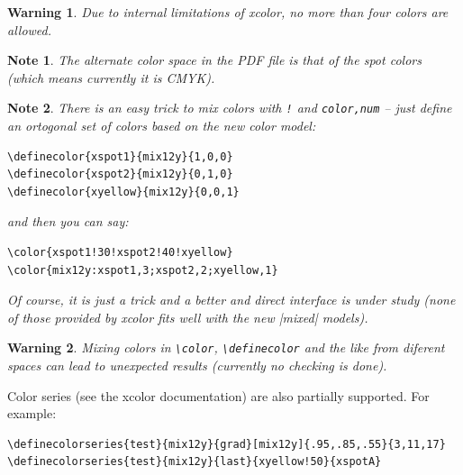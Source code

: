 \documentclass[a4paper]{ltxguide}
\newtheorem{warning}{Warning}
\newtheorem{note}{Note}
\begin{document}
\begin{warning}
  Due to internal limitations of \textsf{xcolor}, no more than four
  colors are allowed.
\end{warning}

\begin{note}
  The alternate color space in the PDF file is that of the spot colors
  (which means currently it is CMYK).
\end{note}

\begin{note}
  There is an easy trick to mix colors with \verb|!| and
  \verb|color,num| -- just define an ortogonal set of colors based on
  the new color model:
\begin{verbatim}
\definecolor{xspot1}{mix12y}{1,0,0}
\definecolor{xspot2}{mix12y}{0,1,0}
\definecolor{xyellow}{mix12y}{0,0,1}
\end{verbatim}
  and then you can say:
\begin{verbatim}
\color{xspot1!30!xspot2!40!xyellow}
\color{mix12y:xspot1,3;xspot2,2;xyellow,1}
\end{verbatim}
  Of course, it is just a trick and a better and direct interface is
  under study (none of those provided by \textsf{xcolor} fits well
  with the new |mixed| models).
\end{note}

\begin{warning}
  Mixing colors in \verb|\color|, \verb|\definecolor| and the like
  from diferent spaces can lead to unexpected results (currently no
  checking is done).
\end{warning}

Color series (see the \textsf{xcolor} documentation) are also
partially supported. For example:
\begin{verbatim}
\definecolorseries{test}{mix12y}{grad}[mix12y]{.95,.85,.55}{3,11,17}
\definecolorseries{test}{mix12y}{last}{xyellow!50}{xspotA}
\end{verbatim}
\end{document}
